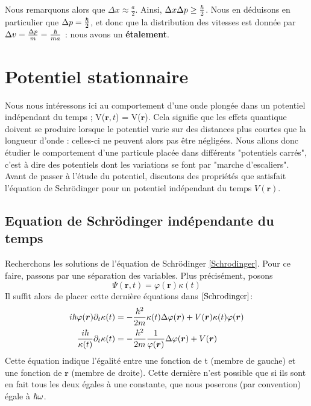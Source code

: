 \documentclass[../notesdecours]{subfiles}
\begin{document}

Nous remarquons alors que $\Delta x \approx \frac{a}{2}$. Ainsi, $\Delta x\Delta p \geq \frac{\hbar}{2}$. Nous en déduisons en particulier que $\Delta p = \frac{\hbar}{2}$, et donc que la distribution des vitesses est donnée par $\Delta v = \frac{\Delta p}{m} = \frac{\hbar}{ma}$ : nous avons un \textbf{étalement}.

\section{Potentiel stationnaire}
Nous nous intéressons ici au comportement d'une onde plongée dans un potentiel indépendant du temps ; V($\bm{r},t$) = V($\bm{r}$). Cela signifie que les effets quantique doivent se produire lorsque le potentiel varie sur des distances plus courtes que la longueur d'onde : celles-ci ne peuvent alors pas être négligées.  Nous allons donc étudier le comportement d'une particule placée dans différents "potentiels carrés", c'est à dire des potentiels dont les variations se font par "marche d'escaliers". Avant de passer à l'étude du potentiel, discutons des propriétés que satisfait l'équation de Schrödinger pour un potentiel indépendant du temps $V(\bm{r})$.\\

\subsection{Equation de Schrödinger indépendante du temps}

Recherchons les solutions de l'équation de Schrödinger \eqref{Schrodinger}. Pour ce faire, passons par une séparation des variables. Plus précisément, posons
\begin{equation}
\Psi(\bm{r},t) = \varphi(\bm{r})\kappa(t)
\end{equation}
Il suffit alors de placer cette dernière équations dans $\eqref{Schrodinger}$:
\begin{align}
i \hbar \varphi(\bm{r})\partial_t \kappa(t) &= - \frac{\hbar^2}{2m} \kappa(t) \Delta \varphi(\bm{r}) + V(\bm{r})\kappa(t)\varphi(\bm{r})\\
\frac{i\hbar}{\kappa(t)} \partial_t \kappa(t) &= - \frac{\hbar^2}{2m} \frac{1}{\varphi(\bm{r})} \Delta \varphi(\bm{r}) + V(\bm{r})
\label{Séparation temporelle et spatiale}
\end{align}
Cette équation indique l'égalité entre une fonction de t (membre de gauche) et une fonction de $\bm{r}$ (membre de droite). Cette dernière n'est possible que si ils sont en fait tous les deux égales à une constante, que nous poserons (par convention) égale à $\hbar \omega$.\\
\end{document}
